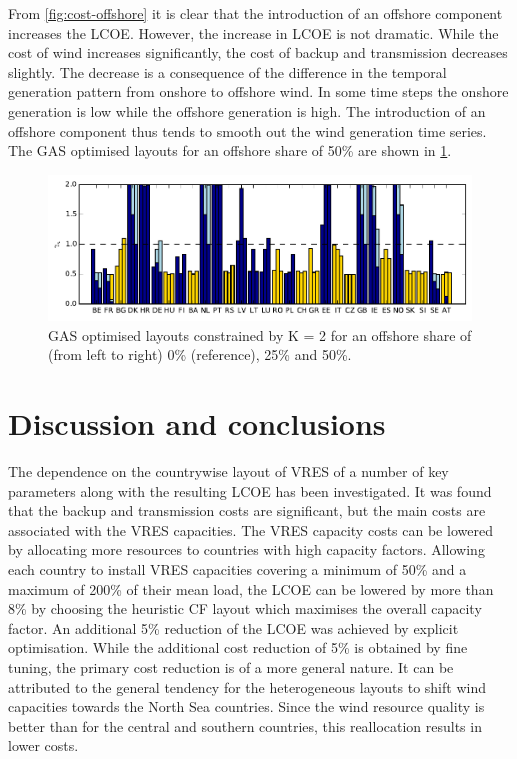 \documentclass[a4paper, 5p, sort&compress]{elsarticle}%
\begin{document}
From \cref{fig:cost-offshore} it is clear that the introduction of an
offshore component increases the LCOE. However, the increase in LCOE
is not dramatic. While the cost of wind increases
significantly, the cost of backup and transmission decreases
slightly. The decrease is a consequence of the difference in the
temporal generation pattern from onshore to offshore wind. In some
time steps the onshore generation is low while the offshore generation
is high. The introduction of an offshore component thus tends to
smooth out the wind generation time series. %
The GAS optimised layouts for an offshore share of 50\% are shown in
\cref{fig:layout-offshore}.

\begin{figure}[t!]
  \centering
  \includegraphics[width = 2\columnwidth, center]{offshoreLayouts-new}
  \caption{GAS optimised layouts constrained by K = 2 for an offshore
    share of (from left to right) 0\% (reference), 25\% and 50\%.} %
  \label{fig:layout-offshore}
\end{figure}

\section{Discussion and conclusions}
\label{sec:four}

The dependence on the countrywise layout of VRES of a number of key
parameters along with the resulting LCOE has been investigated. It was
found that the backup and transmission costs are significant, but the
main costs are associated with the VRES capacities. The VRES capacity
costs can be lowered by allocating more resources to countries with
high capacity factors. Allowing each country to install VRES
capacities covering a minimum of 50\% and a maximum of 200\% of their
mean load, the LCOE can be lowered by more than 8\% by choosing the
heuristic CF layout which maximises the overall capacity factor. An
additional 5\% reduction of the LCOE was achieved by explicit
optimisation. While the additional cost reduction of 5\% is obtained
by fine tuning, the primary cost reduction is of a more general
nature. It can be attributed to the general tendency for the
heterogeneous layouts to shift wind capacities towards the North Sea
countries. Since the wind resource quality is better than for the
central and southern countries, this reallocation results in lower
costs.
\end{document}
